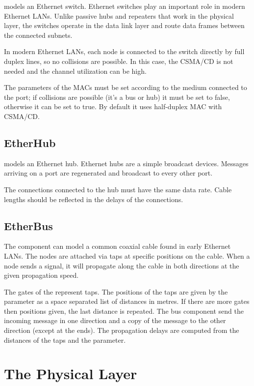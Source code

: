  models an Ethernet switch. Ethernet switches play an
important role in modern Ethernet LANs. Unlike passive hubs and repeaters that
work in the physical layer, the switches operate in the data link layer and
route data frames between the connected subnets.

In modern Ethernet LANs, each node is connected to the switch directly by full
duplex lines, so no collisions are possible. In this case, the CSMA/CD is not
needed and the channel utilization can be high.

The  parameters of the MACs must be set according to the
medium connected to the port; if collisions are possible (it's a bus or hub)
it must be set to false, otherwise it can be set to true.
By default it uses half-duplex MAC with CSMA/CD.

\subsection{EtherHub}

 models an Ethernet hub. Ethernet hubs are a simple broadcast
devices. Messages arriving on a port are regenerated and broadcast to every
other port. 

The connections connected to the hub must have the same data rate.
Cable lengths should be reflected in the delays of the connections.


\subsection{EtherBus}

The  component can model a common coaxial cable
found in early Ethernet LANs. The nodes are attached via taps at specific
positions on the cable. When a node sends a signal, it will propagate
along the cable in both directions at the given propagation speed.

The gates of the  represent taps. The positions
of the taps are given by the  parameter as a
space separated list of distances in metres. If there are more
gates then positions given, the last distance is repeated.
The bus component send the incoming message in one direction and
a copy of the message to the other direction (except at the ends).
The propagation delays are computed from the distances of the taps
and the  parameter.


\section{The Physical Layer}

